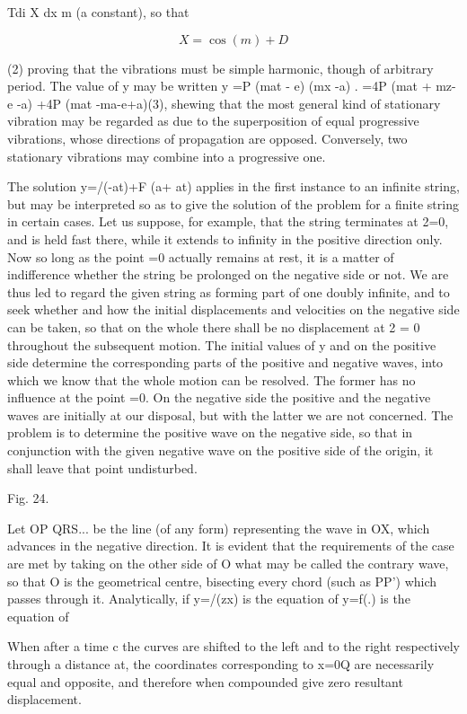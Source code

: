 Tdi X dx m (a constant), so that

\[X= \cos(m) + D\]

(2) proving that the vibrations must be simple harmonic, though of
arbitrary period. The value of y may be written y =P (mat - e) (mx -a) .
=4P (mat + mz-e -a) +4P (mat -ma-e+a)(3),
shewing that the most general kind of stationary vibration may be
regarded as due to the superposition of equal progressive vibrations,
whose directions of propagation are opposed. Conversely, two stationary
vibrations may combine into a progressive one.

The solution y=/(-at)+F (a+ at) applies in the first instance to an
infinite string, but may be interpreted so as to give the solution of
the problem for a finite string in certain cases. Let us suppose, for
example, that the string terminates at 2=0, and is held fast there,
while it extends to infinity in the positive direction only. Now so long
as the point =0 actually remains at rest, it is a matter of indifference
whether the string be prolonged on the negative side or not. We are thus
led to regard the given string as forming part of one doubly infinite,
and to seek whether and how the initial displacements and velocities on
the negative side can be taken, so that on the whole there shall be no
displacement at 2 = 0 throughout the subsequent motion. The initial
values of y and on the positive side determine the corresponding parts
of the positive and negative waves, into which we know that the whole
motion can be resolved. The former has no influence at the point =0. On
the negative side the positive and the negative waves are initially at
our disposal, but with the latter we are not concerned. The problem is
to determine the positive wave on the negative side, so that in
conjunction with the given negative wave on the positive side of the
origin, it shall leave that point undisturbed.

Fig. 24.

Let OP QRS... be the line (of any form) representing the wave in OX,
which advances in the negative direction. It is
evident that the requirements of the case are met by taking on the other
side of O what may be called the contrary wave, so that O is the
geometrical centre, bisecting every chord (such as PP') which passes
through it. Analytically, if y=/(zx) is the equation of y=f(.) is the
equation of

When after a time c the curves are shifted to the left and to the right
respectively through a distance at, the coordinates corresponding to
x=0Q are necessarily equal and opposite, and therefore when compounded
give zero resultant displacement.

